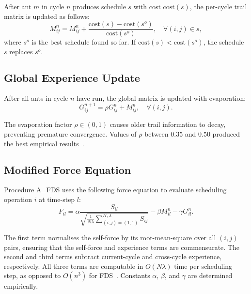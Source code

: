 \documentclass[conference]{IEEEtran}
\begin{document}
After ant $m$ in cycle $n$ produces schedule $s$ with cost
$\text{cost}(s)$, the per-cycle trail matrix is updated as follows:
\begin{equation}
  M^{n}_{ij} = M^{n}_{ij}
    + \frac{\text{cost}(s) - \text{cost}(s^{o})}{\text{cost}(s^{o})},
    \quad \forall (i,j) \in s,
  \label{eq:trail}
\end{equation}
where $s^{o}$ is the best schedule found so far. If $\text{cost}(s) <
\text{cost}(s^{o})$, the schedule $s$ replaces $s^{o}$.

\subsection{Global Experience Update}

After all ants in cycle $n$ have run, the global matrix is updated with
evaporation:
\begin{equation}
  G^{n+1}_{ij} = \rho G^{n}_{ij} + M^{n}_{ij},
    \quad \forall (i,j).
  \label{eq:global}
\end{equation}

The evaporation factor $\rho \in (0,1)$ causes older trail information to
decay, preventing premature convergence. Values of $\rho$ between $0.35$
and $0.50$ produced the best empirical results~\cite{kopuri2004aco}.

\subsection{Modified Force Equation}

Procedure A\_FDS uses the following force equation to evaluate scheduling
operation $i$ at time-step $l$:
\begin{equation}
  F_{il} = \alpha
    \frac{S_{il}}{\displaystyle\sqrt{\frac{1}{N\lambda}
      \sum_{(i,j)=(1,1)}^{N,\lambda} S_{ij}}}
    - \beta M^{n}_{il}
    - \gamma G^{n}_{il}.
  \label{eq:force}
\end{equation}

The first term normalises the self-force by its root-mean-square over all
$(i,j)$ pairs, ensuring that the self-force and experience terms are
commensurate. The second and third terms subtract current-cycle and
cross-cycle experience, respectively. All three terms are computable in
$O(N\lambda)$ time per scheduling step, as opposed to $O(n^{3})$ for
FDS~\cite{kopuri2004aco}. Constants $\alpha$, $\beta$, and $\gamma$ are
determined empirically.

\end{document}
